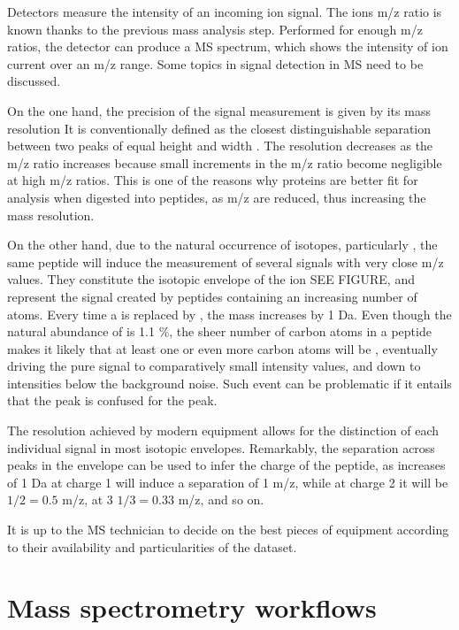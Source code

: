 \documentclass[11pt, a4paper]{report}
\begin{document}
Detectors measure the intensity of an incoming ion signal. The ion\textquotesingle s \ac{m/z} ratio is known thanks to the previous mass analysis step. Performed for enough \ac{m/z} ratios, the detector can produce a \ac{MS} spectrum, which shows the intensity of ion current over an \ac{m/z} range. Some topics in signal detection in \ac{MS} need to be discussed.

On the one hand, the precision of the signal measurement is given by its mass resolution It is conventionally defined as the closest distinguishable separation between two peaks of equal height and width \cite{Marshall2013}. The resolution decreases as the \ac{m/z} ratio increases because small increments in the \ac{m/z} ratio become negligible at high \ac{m/z} ratios. This is one of the reasons why proteins are better fit for analysis when digested into peptides, as \ac{m/z} are reduced, thus increasing the mass resolution.

On the other hand, due to the natural occurrence of isotopes, particularly , the same peptide will induce the measurement of several signals with very close \ac{m/z} values. They constitute the isotopic envelope of the ion SEE FIGURE, and represent the signal created by peptides containing an increasing number of  atoms. Every time a  is replaced by , the mass increases by 1 Da. Even though the natural abundance of  is 1.1 \%, the sheer number of carbon atoms in a peptide makes it likely that at least one or even more carbon atoms will be , eventually driving the pure  signal to comparatively small intensity values, and down to intensities below the background noise. Such event can be problematic if it entails that the  peak is confused for the  peak.

The resolution achieved by modern equipment allows for the distinction of each individual signal in most isotopic envelopes. Remarkably, the separation across peaks in the envelope can be used to infer the charge of the peptide, as increases of 1 Da at charge 1 will induce a separation of 1 \ac{m/z}, while at charge 2 it will be $1/2 = 0.5$ \ac{m/z}, at 3 $1/3 = 0.33$ \ac{m/z}, and so on.

It is up to the \ac{MS} technician to decide on the best pieces of equipment according to their availability and particularities of the dataset.

\section{Mass spectrometry workflows}
\label{sec:mass_spectrometry_workflows}
\end{document}
